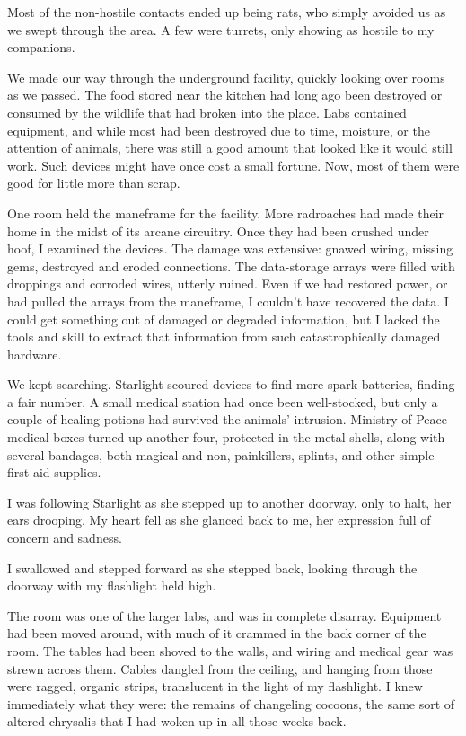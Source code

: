 Most of the non-hostile contacts ended up being rats, who simply avoided us as we swept through the area. A few were turrets, only showing as hostile to my companions.

We made our way through the underground facility, quickly looking over rooms as we passed. The food stored near the kitchen had long ago been destroyed or consumed by the wildlife that had broken into the place. Labs contained equipment, and while most had been destroyed due to time, moisture, or the attention of animals, there was still a good amount that looked like it would still work. Such devices might have once cost a small fortune. Now, most of them were good for little more than scrap.

One room held the maneframe for the facility. More radroaches had made their home in the midst of its arcane circuitry. Once they had been crushed under hoof, I examined the devices. The damage was extensive: gnawed wiring, missing gems, destroyed and eroded connections. The data-storage arrays were filled with droppings and corroded wires, utterly ruined. Even if we had restored power, or had pulled the arrays from the maneframe, I couldn’t have recovered the data. I could get something out of damaged or degraded information, but I lacked the tools and skill to extract that information from such catastrophically damaged hardware.

We kept searching. Starlight scoured devices to find more spark batteries, finding a fair number. A small medical station had once been well-stocked, but only a couple of healing potions had survived the animals’ intrusion. Ministry of Peace medical boxes turned up another four, protected in the metal shells, along with several bandages, both magical and non, painkillers, splints, and other simple first-aid supplies.

I was following Starlight as she stepped up to another doorway, only to halt, her ears drooping. My heart fell as she glanced back to me, her expression full of concern and sadness.

I swallowed and stepped forward as she stepped back, looking through the doorway with my flashlight held high.

The room was one of the larger labs, and was in complete disarray. Equipment had been moved around, with much of it crammed in the back corner of the room. The tables had been shoved to the walls, and wiring and medical gear was strewn across them. Cables dangled from the ceiling, and hanging from those were ragged, organic strips, translucent in the light of my flashlight. I knew immediately what they were: the remains of changeling cocoons, the same sort of altered chrysalis that I had woken up in all those weeks back.

